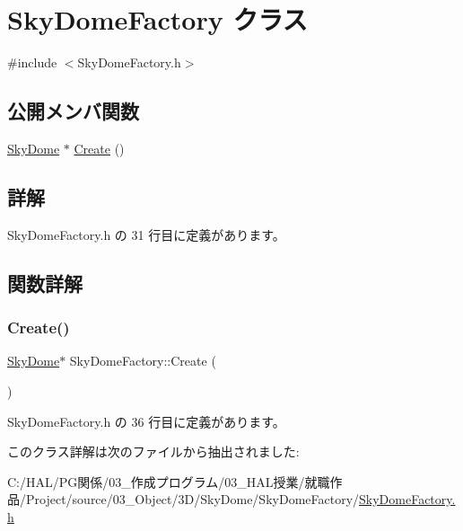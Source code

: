\hypertarget{class_sky_dome_factory}{}\section{Sky\+Dome\+Factory クラス}
\label{class_sky_dome_factory}


{\ttfamily \#include $<$Sky\+Dome\+Factory.\+h$>$}

\subsection*{公開メンバ関数}
\begin{DoxyCompactItemize}
\item 
\mbox{\hyperlink{class_sky_dome}{Sky\+Dome}} $\ast$ \mbox{\hyperlink{class_sky_dome_factory_a70f27fa64d7cbd5164fc44de566a1683}{Create}} ()
\end{DoxyCompactItemize}


\subsection{詳解}


 Sky\+Dome\+Factory.\+h の 31 行目に定義があります。



\subsection{関数詳解}
\mbox{\label{class_sky_dome_factory_a70f27fa64d7cbd5164fc44de566a1683}} 
\subsubsection{\texorpdfstring{Create()}{Create()}}
{\footnotesize\ttfamily \mbox{\hyperlink{class_sky_dome}{Sky\+Dome}}$\ast$ Sky\+Dome\+Factory\+::\+Create (\begin{DoxyParamCaption}{ }\end{DoxyParamCaption})\hspace{0.3cm}{\ttfamily [inline]}}



 Sky\+Dome\+Factory.\+h の 36 行目に定義があります。



このクラス詳解は次のファイルから抽出されました\+:\begin{DoxyCompactItemize}
\item 
C\+:/\+H\+A\+L/\+P\+G関係/03\+\_\+作成プログラム/03\+\_\+\+H\+A\+L授業/就職作品/\+Project/source/03\+\_\+\+Object/3\+D/\+Sky\+Dome/\+Sky\+Dome\+Factory/\mbox{\hyperlink{_sky_dome_factory_8h}{Sky\+Dome\+Factory.\+h}}\end{DoxyCompactItemize}
